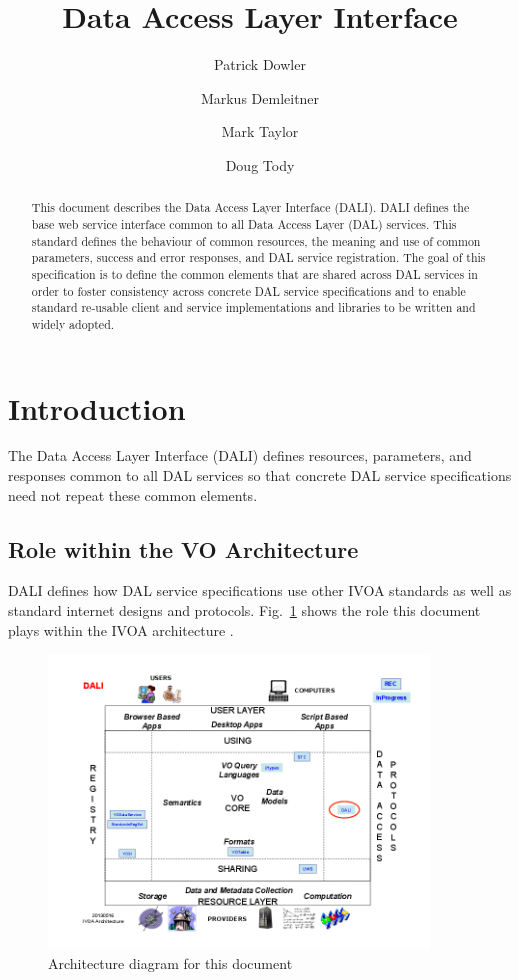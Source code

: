 \documentclass[11pt,letter]{ivoa}
\title{Data Access Layer Interface}
\author{Patrick Dowler}
\author{Markus Demleitner}
\author{Mark Taylor}
\author{Doug Tody}
\begin{document}
\begin{abstract}
This document describes the Data Access Layer Interface (DALI). DALI defines 
the base web service interface common to all Data Access Layer (DAL) services. 
This standard defines the behaviour of common resources, the meaning and use of 
common parameters, success and error responses, and DAL service registration. 
The goal of this specification is to define the common elements that are shared 
across DAL services in order to foster consistency across concrete DAL service 
specifications and to enable standard re-usable client and service 
implementations and libraries to be written and widely adopted.
\end{abstract}

\section{Introduction}
The Data Access Layer Interface (DALI) defines resources, parameters, and 
responses common to all DAL services so that concrete DAL service specifications 
need not repeat these common elements.

\subsection{Role within the VO Architecture}
DALI defines how DAL service specifications use other IVOA standards as well as 
standard internet designs and protocols. Fig.~\ref{fig:archdiag} shows the role 
this document plays within the IVOA architecture \citep{note:VOARCH}.

\begin{figure}
\centering


\includegraphics[width=0.9\textwidth]{archdiag.png}
\caption{Architecture diagram for this document}
\label{fig:archdiag}
\end{figure}
\end{document}
